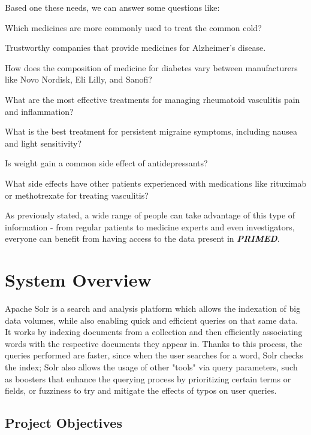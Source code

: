 \documentclass[sigconf]{acmart}
\begin{document}
Based one these needs, we can answer some questions like: 
\begin{arrowlist}
	\item Which medicines are more commonly used to treat the common cold?
        \item Trustworthy companies that provide medicines for Alzheimer’s disease. 
	\item How does the composition of medicine for diabetes vary between manufacturers like Novo Nordisk, Eli Lilly, and Sanofi?
	\item What are the most effective treatments for managing rheumatoid vasculitis pain and inflammation?
	\item What is the best treatment for persistent migraine symptoms, including nausea and light sensitivity?
	\item Is weight gain a common side effect of antidepressants?
	\item What side effects have other patients experienced with medications like rituximab or methotrexate for treating vasculitis?
\end{arrowlist}

As previously stated, a wide range of people can take advantage of this type of information - from regular patients to medicine experts and even investigators, everyone can benefit from having access to the data present in \textit{\textbf{PRIMED}}.

\section{System Overview}

Apache Solr\cite{solr} is a search and analysis platform which allows the indexation of big data volumes, while also enabling quick and efficient queries on that same data. It works by indexing documents from a collection and then efficiently associating words with the respective documents they appear in. Thanks to this process, the queries performed are faster, since when the user searches for a word, Solr checks the index; Solr also allows the usage of other "tools" via query parameters, such as boosters that enhance the querying process by prioritizing certain terms or fields, or fuzziness to try and mitigate the effects of typos on user queries.

\subsection{Project Objectives}
\end{document}
